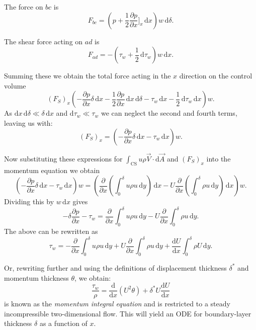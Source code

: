 The force on $bc$ is
\[ 
F_{bc} = \left( p + \frac{1}{2}  \frac{\partial p}{\partial x} \Bigg]_x \, \mathrm{d}x  \right)w \, \mathrm{d}\delta
.\]

The shear force acting on $ad$ is
\[ 
F_{ad} = - \left( \tau_w + \frac{1}{2} \, \mathrm{d}\tau_w \right)w \, \mathrm{d}x 
.\]

Summing these we obtain the total force acting in the $x$ direction on the control volume
\[ 
  \left( F_S \right)_x \left( - \frac{\partial p}{\partial x} \delta \, \mathrm{d}x - \frac{1}{2} \frac{\partial p}{\partial x} \, \mathrm{d}x \, \mathrm{d}\delta - \tau_w \, \mathrm{d}x - \frac{1}{2} \, \mathrm{d}\tau_w \, \mathrm{d}x  \right) w
.\]
As $\mathrm{d}x  \, \mathrm{d}\delta \ll \delta \, \mathrm{d}x $ and $\mathrm{d}\tau_w \ll \tau_w$ we can neglect the second and fourth terms, leaving us with:
\[ 
\left( F_S \right)_x = \left( - \frac{\partial p}{\partial x} \delta \, \mathrm{d}x  - \tau_w \, \mathrm{d}x  \right)w
.\]

Now substituting these expressions for $\int_{\mathrm{CS}} u \rho \Vec{V} \cdot \mathrm{d}\Vec{A}$   and $\left( F_S \right)_x$ into the momentum equation we obtain
\[ 
\left( - \frac{\partial p}{\partial x} \delta \, \mathrm{d}x - \tau_w \, \mathrm{d}x  \right)w = \left( \frac{\partial }{\partial x} \left( \int_{0}^{\delta} u \rho u \, \mathrm{d}y  \right)\, \mathrm{d}x - U \frac{\partial }{\partial x} \left( \int_{0}^{\delta} \rho u \, \mathrm{d}y  \right)\, \mathrm{d}x  \right)w
.\]
Dividing this by $w \, \mathrm{d}x $ gives
\[ 
- \delta \frac{\partial p}{\partial x} - \tau_w = \frac{\partial }{\partial x} \int_{0}^{\delta} u \rho u \, \mathrm{d}y - U \frac{\partial }{\partial x} \int_{0}^{\delta} \rho u \, \mathrm{d}y
.\]
The above can be rewritten as
\[ 
\tau_w = - \frac{\partial }{\partial x} \int_{0}^{\delta} u \rho u \, \mathrm{d}y + U \frac{\partial }{\partial x} \int_{0}^{\delta} \rho u \, \mathrm{d}y + \frac{\mathrm{d}U}{\mathrm{d}x} \int_{0}^{\delta} \rho U \, \mathrm{d}y 
.\]

Or, rewriting further and using the definitions of displacement thickness $\delta^{*}$ and momentum thickness $\theta$, we obtain:
\begin{equation} \label{eq:mominteq}
  \frac{\tau_w}{\rho} = \frac{\mathrm{d}}{\mathrm{d}x} \left( U^2 \theta \right) + \delta^{*}U \frac{\mathrm{d}U}{\mathrm{d}x} 
\end{equation}
 is known as the \textit{momentum integral equation} and is restricted to a steady incompressible two-dimensional flow.
This will yield an ODE for boundary-layer thickness $\delta$ as a function of $x$.


